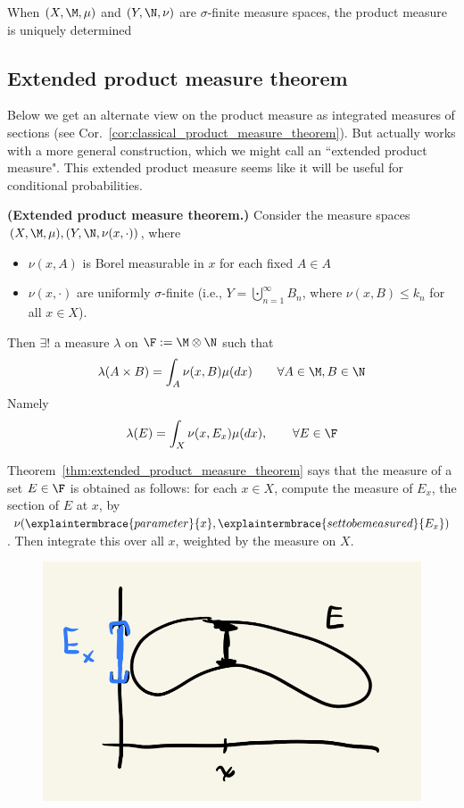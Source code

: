 \documentclass{article} %
\begin{document}
\begin{remark}
When $(X,\M, \mu)$ and $(Y,\N, \nu)$ are $\sigma$-finite measure spaces, the product measure is uniquely determined \cite[pp.64]{folland1999real}
\end{remark}
 

\subsection{Extended product measure theorem}

Below we get an alternate view on the product measure as integrated measures of sections (see Cor.~\ref{cor:classical_product_measure_theorem}).   But \cite{ash2000probability} actually works with a more general construction, which we might call an ``extended product measure".  This extended product measure seems like it will be useful for conditional probabilities. 

\begin{theorem}\textbf{(Extended product measure theorem.)} \cite[Thm.~2.6.2]{ash2000probability}
Consider the measure spaces $(X, \M, \mu), (Y, \N, \nu(x, \cdot))$, where 
\begin{itemize}
\item $\nu(x,A)$ is Borel measurable in $x$ for each fixed $A \in A$
\item $\nu(x, \cdot)$ are uniformly $\sigma$-finite \tiny{ (i.e., $Y= \bigcupdot_{n=1}^\infty B_n$, where $\nu(x,B) \leq k_n$ for all $x \in X$)}.	
\end{itemize}
Then $\exists!$ a measure $\lambda$ on $\F := \M \otimes \N$ such that 
\[\lambda(A \times B) = \int_A \nu(x,B) \mu(dx) \quad \quad \forall A \in \M, B \in \N \]
Namely
\begin{align}
\lambda(E) = \int_X \nu(x,E_x) \mu(dx), \quad \quad \forall E \in \F
\label{eqn:measure_of_set_in_product_space}
\end{align}
\label{thm:extended_product_measure_theorem}
\end{theorem}

\begin{remark}
Theorem~\ref{thm:extended_product_measure_theorem} says that the measure of a set $E \in \F$ is obtained as follows: for each $x \in X$, compute the measure of $E_x$, the section of $E$ at $x$, by $\nu(\explaintermbrace{parameter}{x}, \explaintermbrace{set to be measured}{E_x})$.  Then integrate this over all $x$, weighted by the measure on $X$. 
\begin{figure}[H]
\centering
\includegraphics[width=.4\textwidth]{images/product_measure_theorem}	
\end{figure}

\end{remark}
\end{document}
